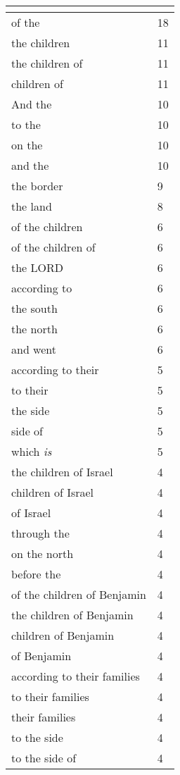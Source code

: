 \begin{center}
\begin{longtable}{|p{3.0in}|p{0.5in}|}
\hline \multicolumn{2}{c}{{ }} \\ \hline
\endfoot 
of the & 18\\ \hline 
the children & 11\\ \hline 
the children of & 11\\ \hline 
children of & 11\\ \hline 
And the & 10\\ \hline 
to the & 10\\ \hline 
on the & 10\\ \hline 
and the & 10\\ \hline 
the border & 9\\ \hline 
the land & 8\\ \hline 
of the children & 6\\ \hline 
of the children of & 6\\ \hline 
the LORD & 6\\ \hline 
according to & 6\\ \hline 
the south & 6\\ \hline 
the north & 6\\ \hline 
and went & 6\\ \hline 
according to their & 5\\ \hline 
to their & 5\\ \hline 
the side & 5\\ \hline 
side of & 5\\ \hline 
which \emph{is} & 5\\ \hline 
the children of Israel & 4\\ \hline 
children of Israel & 4\\ \hline 
of Israel & 4\\ \hline 
through the & 4\\ \hline 
on the north & 4\\ \hline 
before the & 4\\ \hline 
of the children of Benjamin & 4\\ \hline 
the children of Benjamin & 4\\ \hline 
children of Benjamin & 4\\ \hline 
of Benjamin & 4\\ \hline 
according to their families & 4\\ \hline 
to their families & 4\\ \hline 
their families & 4\\ \hline 
to the side & 4\\ \hline 
to the side of & 4\\ \hline 

\end{longtable}
\end{center}
